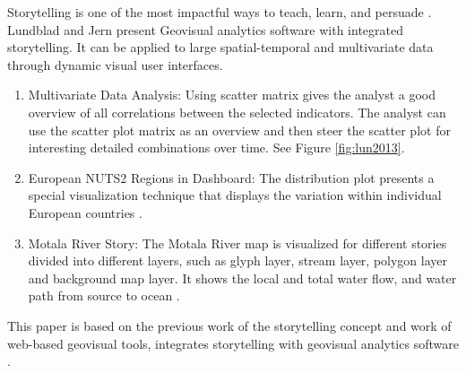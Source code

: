 \documentclass{egpubl}
\begin{document}
Storytelling is one of the most impactful ways to teach, learn, and persuade \cite{lundblad2013}. 
Lundblad and Jern present Geovisual analytics software with integrated storytelling. It can be applied to large spatial-temporal and multivariate data through dynamic visual user interfaces. 
\begin{enumerate}
\item Multivariate Data Analysis: Using scatter matrix gives the analyst a good overview of all correlations between the selected
indicators. The analyst can use the scatter plot matrix as an overview and then steer the scatter plot for interesting detailed combinations over time. See Figure \ref{fig:lun2013}\cite{lundblad2013}.
\item European NUTS2 Regions in Dashboard: The distribution plot presents a special visualization technique that displays the variation within individual European countries \cite{lundblad2013}.
\item Motala River Story: The Motala River map is visualized for different stories divided into different layers, such as glyph layer, stream layer, polygon layer and background map layer. It shows the local and total water flow, and water path from source to ocean \cite{lundblad2013}.
\end{enumerate}
This paper is based on the previous work of the storytelling concept and work of web-based geovisual tools, integrates storytelling with geovisual analytics software \cite{lundblad2013}.
\end{document}

